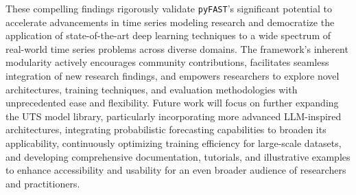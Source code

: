 \documentclass[twoside,11pt]{article}
\begin{document}
These compelling findings rigorously validate \texttt{pyFAST}'s significant potential to accelerate advancements in time series modeling research and democratize the application of state-of-the-art deep learning techniques to a wide spectrum of real-world time series problems across diverse domains.  The framework's inherent modularity actively encourages community contributions, facilitates seamless integration of new research findings, and empowers researchers to explore novel architectures, training techniques, and evaluation methodologies with unprecedented ease and flexibility.  Future work will focus on further expanding the UTS model library, particularly incorporating more advanced LLM-inspired architectures, integrating probabilistic forecasting capabilities to broaden its applicability, continuously optimizing training efficiency for large-scale datasets, and developing comprehensive documentation, tutorials, and illustrative examples to enhance accessibility and usability for an even broader audience of researchers and practitioners.  



\end{document}
